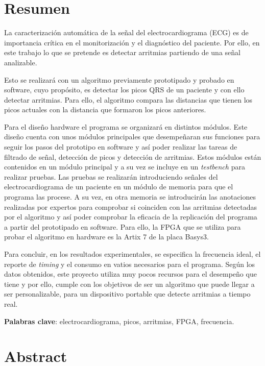 \chapter{Resumen}

La caracterización automática de la señal del electrocardiograma (ECG) es de importancia crítica en el monitorización y el diagnóstico del paciente. Por ello, en este trabajo lo que se pretende es detectar arritmias partiendo de una señal analizable. 

Esto se realizará con un algoritmo previamente prototipado y probado en software, cuyo propósito, es detectar los picos QRS de un paciente y con ello detectar arritmias. Para ello, el algoritmo compara las distancias que tienen los picos actuales con la distancia que formaron los picos anteriores.

Para el diseño hardware el programa se organizará en distintos módulos. Este diseño cuenta con unos módulos principales que desempeñaran sus funciones para seguir los pasos del prototipo en software y así poder realizar las tareas de filtrado de señal, detección de picos y detección de arritmias.
Estos módulos están contenidos en un módulo principal y a su vez se incluye en un \textit{testbench} para realizar pruebas. Las pruebas se realizarán introduciendo señales del electrocardiograma de un paciente en un módulo de memoria para que el programa las procese. A su vez, en otra memoria se introducirán las anotaciones realizadas por expertos para comprobar si coinciden con las arritmias detectadas por el algoritmo y así poder comprobar la eficacia de la replicación del programa a partir del prototipado en software. Para ello, la FPGA que se utiliza para probar el algoritmo en hardware es la Artix 7 de la placa Basys3.

Para concluir, en los resultados experimentales, se especifica la frecuencia ideal, el reporte de \textit{timing} y el consumo en vatios necesarios para el programa. Según los datos obtenidos, este proyecto utiliza muy pocos recursos para el desempeño que tiene y por ello, cumple con los objetivos de ser un algoritmo que puede llegar a ser personalizable, para un dispositivo portable que detecte arritmias a tiempo real.

\noindent\textbf{Palabras clave}: electrocardiograma, picos, arritmias, FPGA, frecuencia.

\chapter{Abstract}

